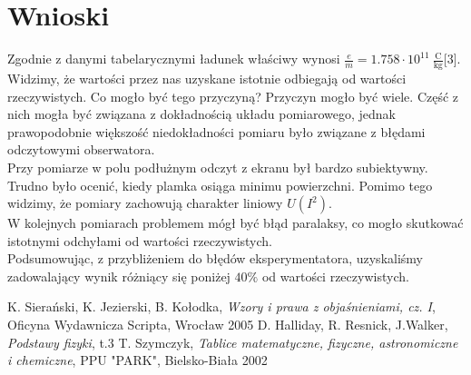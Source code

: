 \documentclass[paper=a4, fontsize=12pt]{scrartcl}
\begin{document}
\section{Wnioski}
Zgodnie z danymi tabelarycznymi ładunek właściwy wynosi $\frac{e}{m}=1.758\cdot10^{11}\:\mathrm{\frac{C}{kg}}$[3].\\
Widzimy, że wartości przez nas uzyskane istotnie odbiegają od wartości rzeczywistych. Co mogło być tego przyczyną? Przyczyn mogło być wiele. Część z nich mogła być związana z dokładnością układu pomiarowego, jednak prawopodobnie większość niedokładności pomiaru było związane z błędami odczytowymi obserwatora.\\
 Przy pomiarze w polu podłużnym odczyt z ekranu był bardzo subiektywny. Trudno było ocenić, kiedy plamka osiąga minimu powierzchni. Pomimo tego widzimy, że pomiary zachowują charakter liniowy $U(I^2)$. \\
 W kolejnych pomiarach problemem mógł być błąd paralaksy, co mogło skutkować istotnymi odchyłami od wartości rzeczywistych. \\
 Podsumowując, z przybliżeniem do błędów eksperymentatora, uzyskaliśmy zadowalający wynik różniący się poniżej $40\%$ od wartości rzeczywistych.
\begin{thebibliography}{99}
	K. Sierański, K. Jezierski, B. Kołodka, \textit{ Wzory i prawa z objaśnieniami, cz. I}, Oficyna  Wydawnicza Scripta, Wrocław 2005
	 D. Halliday, R. Resnick, J.Walker, \textit{Podstawy fizyki}, t.3 
	T. Szymczyk, \emph{Tablice matematyczne, fizyczne, astronomiczne i chemiczne}, PPU "PARK", Bielsko-Biała 2002
\end{thebibliography}
\end{document}
